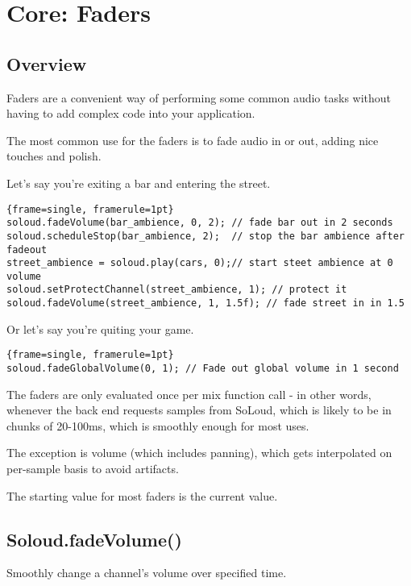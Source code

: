 
\chapter{Core: Faders}

\section{Overview}

Faders are a convenient way of performing some common audio tasks without having to add complex code into your application.

The most common use for the faders is to fade audio in or out, adding nice touches and polish.

Let's say you're exiting a bar and entering the street.

\begin{lstlisting}{frame=single, framerule=1pt}
soloud.fadeVolume(bar_ambience, 0, 2); // fade bar out in 2 seconds
soloud.scheduleStop(bar_ambience, 2);  // stop the bar ambience after fadeout
street_ambience = soloud.play(cars, 0);// start steet ambience at 0 volume
soloud.setProtectChannel(street_ambience, 1); // protect it
soloud.fadeVolume(street_ambience, 1, 1.5f); // fade street in in 1.5
\end{lstlisting}

Or let's say you're quiting your game.

\begin{lstlisting}{frame=single, framerule=1pt}
soloud.fadeGlobalVolume(0, 1); // Fade out global volume in 1 second
\end{lstlisting}

The faders are only evaluated once per mix function call - in other words, whenever the back end requests samples from SoLoud, which is likely to be in chunks of 20-100ms, which is smoothly enough for most uses.

The exception is volume (which includes panning), which gets interpolated on per-sample basis to avoid artifacts.

The starting value for most faders is the current value.

\section{Soloud.fadeVolume()}

Smoothly change a channel's volume over specified time.

